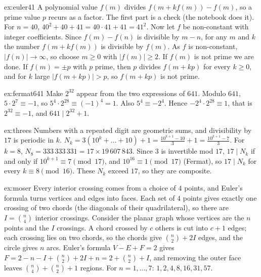\begin{solution}{ex:euler41}
\idea A polynomial value $f(m)$ divides $f(m+kf(m))-f(m)$, so a prime value $p$ recurs as a factor.
\writeup The first part is a check (the notebook does it). For $n=40$, $40^2+40+41=40\cdot41+41=41^2$. Now let $f$ be non-constant with integer coefficients.
Since $f(m)-f(n)$ is divisible by $m-n$, for any $m$ and $k$ the number $f(m+kf(m))$ is divisible by $f(m)$. As $f$ is non-constant, $|f(n)|\to\infty$, so choose
$m\ge0$ with $|f(m)|\ge2$. If $f(m)$ is not prime we are done. If $f(m)=\pm p$ with $p$ prime, then $p$ divides $f(m+kp)$ for every $k\ge0$, and for $k$ large
$|f(m+kp)|>p$, so $f(m+kp)$ is not prime.
\end{solution}

\begin{solution}{ex:fermat641}
\idea Make $2^{32}$ appear from the two expressions of $641$.
\writeup Modulo $641$, $5\cdot2^7\equiv-1$, so $5^4\cdot2^{28}\equiv(-1)^4=1$. Also $5^4\equiv-2^4$. Hence $-2^4\cdot2^{28}\equiv1$, that is $2^{32}\equiv-1$, and
$641\mid2^{32}+1$.
\end{solution}

\begin{solution}{ex:threes}
\idea Numbers with a repeated digit are geometric sums, and divisibility by $17$ is periodic in $k$.
\writeup $N_k=3(10^k+\dots+10)+1=\frac{10^{k+1}-10}3+1=\frac{10^{k+1}-7}3$. For $k=8$, $N_8=333\,333\,331=17\times19\,607\,843$. Since $3$ is invertible mod $17$, $17\mid N_k$
if and only if $10^{k+1}\equiv7\pmod{17}$, and $10^{16}\equiv1\pmod{17}$ (Fermat), so $17\mid N_k$ for every $k\equiv8\pmod{16}$. These $N_k$ exceed $17$, so they are
composite.
\end{solution}

\begin{solution}{ex:moser}
\idea Every interior crossing comes from a choice of $4$ points, and Euler's formula turns vertices and edges into faces.
\writeup Each set of $4$ points gives exactly one crossing of two chords (the diagonals of their quadrilateral), so there are $I=\binom n4$ interior crossings.
Consider the planar graph whose vertices are the $n$ points and the $I$ crossings. A chord crossed by $c$ others is cut into $c+1$ edges; each crossing lies
on two chords, so the chords give $\binom n2+2I$ edges, and the circle gives $n$ arcs. Euler's formula $V-E+F=2$ gives
$F=2-n-I+\binom n2+2I+n=2+\binom n2+I$, and removing the outer face leaves $\binom n4+\binom n2+1$ regions. For $n=1,\dots,7$: $1,2,4,8,16,31,57$.
\end{solution}

